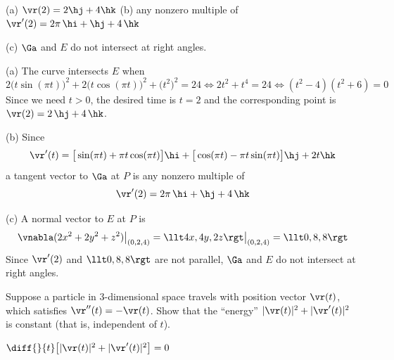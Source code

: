 
\begin{answer}
(a) $\vr(2)=2\hj+4\hk$\qquad
(b) any nonzero multiple of $\vr'(2)=2\pi\,\hi+\hj+4\,\hk$

(c) $\Ga$ and $E$ do not intersect at right angles.
\end{answer}

\begin{solution}
(a) The curve intersects $E$ when
\begin{equation*}
2\big(t\sin(\pi t)\big)^2+2\big(t\cos(\pi t)\big)^2 +\big(t^2\big)^2=24
\iff 2t^2+t^4=24
\iff (t^2-4)(t^2+6)=0
\end{equation*}
Since we need $t>0$, the desired time is $t=2$ and the corresponding point
is $\vr(2)=2\,\hj+4\,\hk$.

(b) Since
\begin{equation*}
\vr'(t)=\big[\sin(\pi t)+\pi t\cos(\pi t)\big]\hi
    +\big[\cos(\pi t)-\pi t\sin(\pi t)\big]\hj + 2t\hk
\end{equation*}
a tangent vector to $\Ga$ at $P$ is any nonzero multiple of
\begin{equation*}
\vr'(2)=2\pi\,\hi+\hj+4\,\hk
\end{equation*}

(c) A normal vector to $E$ at $P$ is
\begin{equation*}
\vnabla(2x^2+2y^2+z^2)\big|_{(0,2,4)}= \llt 4x,4y,2z\rgt\big|_{(0,2,4)}
=\llt 0,8,8\rgt
\end{equation*}
Since $\vr'(2)$ and $\llt 0,8,8\rgt$ are not parallel, $\Ga$ and $E$
do not intersect at right angles.
\end{solution}

\begin{question} [M200 2001A] %
Suppose a particle in 3-dimensional space travels with
position vector $\vr(t)$, which satisfies $\vr''(t)=-\vr(t)$. Show
that the ``energy'' $|\vr(t)|^2+|\vr'(t)|^2$ is constant (that is,
independent of $t$).
\end{question}

%

\begin{answer}
$\diff{}{t}\big[|\vr(t)|^2+|\vr'(t)|^2\big]=0$
\end{answer}

